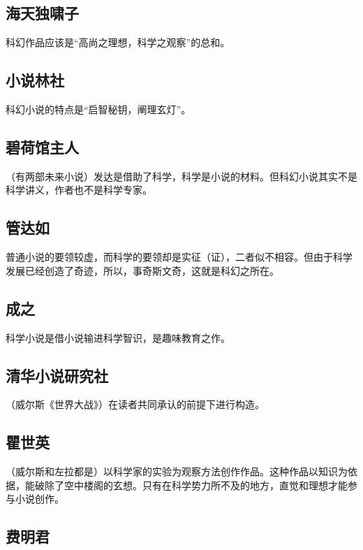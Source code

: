 \documentclass{ctexart}
\begin{document}
\subsection{海天独啸子}
科幻作品应该是“高尚之理想，科学之观察”的总和。

\subsection{小说林社}

科幻小说的特点是“启智秘钥，阐理玄灯”。



\subsection{碧荷馆主人}

（有两部未来小说）发达是借助了科学，科学是小说的材料。但科幻小说其实不是科学讲义，作者也不是科学专家。

\subsection{管达如}

普通小说的要领较虚，而科学的要领却是实征（证），二者似不相容。但由于科学发展已经创造了奇迹，所以，事奇斯文奇，这就是科幻之所在。

\subsection{成之}

科学小说是借小说输进科学智识，是趣味教育之作。

\subsection{清华小说研究社}

（威尔斯《世界大战》）在读者共同承认的前提下进行构造。

\subsection{瞿世英}

（威尔斯和左拉都是）以科学家的实验为观察方法创作作品。这种作品以知识为依据，能破除了空中楼阁的玄想。只有在科学势力所不及的地方，直觉和理想才能参与小说创作。

\subsection{费明君}
\end{document}
